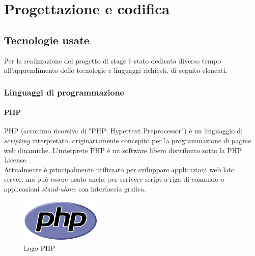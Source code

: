 
\chapter{Progettazione e codifica}
\label{cap:progettazione-codifica}

\section{Tecnologie usate}
\label{sec:tecnologie-strumenti}

Per la realizzazione del progetto di stage è stato dedicato diverso tempo all'apprendimento delle tecnologie e linguaggi richiesti, di seguito elencati.

\subsection{Linguaggi di programmazione}

\subsubsection{PHP}
PHP (acronimo ricorsivo di "PHP: Hypertext Preprocessor") è un linguaggio di \textit{scripting} interpretato, originariamente concepito per la programmazione di pagine web dinamiche. L'interprete PHP è un software libero distribuito sotto la PHP License.
\\
Attualmente è principalmente utilizzato per sviluppare applicazioni web lato server, ma può essere usato anche per scrivere script a riga di comando o applicazioni \textit{stand-alone} con interfaccia grafica.
\\
\begin{figure}[!h] 
    \centering 
    \includegraphics[width=4cm]{immagini/loghi/php.png}
    \caption{Logo PHP}
\end{figure}

